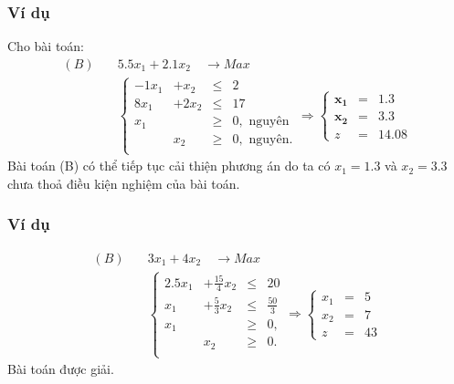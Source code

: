 \documentclass[12pt,a4paper]{report}
\begin{document}
\subsubsection*{Ví dụ}
Cho bài toán:
        \begin{equation} \label{baitoannguyenloi}
        \begin{split}
            (B) \quad & 5.5x_1 + 2.1x_2 \quad \longrightarrow Max \\
            & \left\{\begin{array} {cccc}
            -1x_1 &+ x_2 &\leq& 2 \\
            8x_1 &+ 2x_2 &\leq& 17 \\
            x_1 &&\geq & 0, \text{ nguyên} \\
            &x_2 &\geq& 0, \text{ nguyên}. \\
            \end{array}\right.
            \Longrightarrow
            \left\{\begin{array} {ccc}
            \mathbf{x_1} & \mathbf{=}& \mathbf{1.3} \\
            \mathbf{x_2} &\mathbf{=}& \mathbf{3.3} \\
            z &=&14.08
        \end{array}\right.
        \end{split}
        \end{equation}
    Bài toán (B) có thể tiếp tục cải thiện phương án do ta có $x_1=1.3$ và $x_2=3.3$ chưa thoả điều kiện nghiệm của bài toán.



\subsubsection*{Ví dụ}
        \begin{equation} \label{baitoannguyenhet}
        \begin{split}
            (B) \quad & 3x_1 + 4x_2 \quad \longrightarrow Max \\
            & \left\{\begin{array} {cccc}
            2.5x_1 &+ \frac{15}{4}x_2 &\leq& 20 \\
            x_1 &+ \frac{5}{3}x_2 &\leq& \frac{50}{3} \\
            x_1 &&\geq &0, \\
            &x_2 &\geq& 0. \\
            \end{array}\right.
            \Longrightarrow
            \left\{\begin{array}{ccc}
            x_1 &= &5 \\
            x_2 &= &7 \\
            z& =&43
        \end{array}\right.
        \end{split}
        \end{equation}
    Bài toán được giải.
\end{document}
